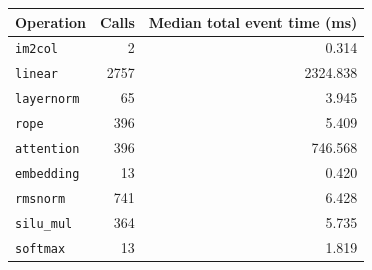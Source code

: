 \begin{center}
\begin{tabular}{@{}lrr@{}}
\toprule
Operation & Calls & Median total event time (ms) \\
\midrule
\texttt{im2col} & 2 & 0.314 \\
\texttt{linear} & 2757 & 2324.838 \\
\texttt{layernorm} & 65 & 3.945 \\
\texttt{rope} & 396 & 5.409 \\
\texttt{attention} & 396 & 746.568 \\
\texttt{embedding} & 13 & 0.420 \\
\texttt{rmsnorm} & 741 & 6.428 \\
\texttt{silu\_mul} & 364 & 5.735 \\
\texttt{softmax} & 13 & 1.819 \\
\bottomrule
\end{tabular}
\end{center}
